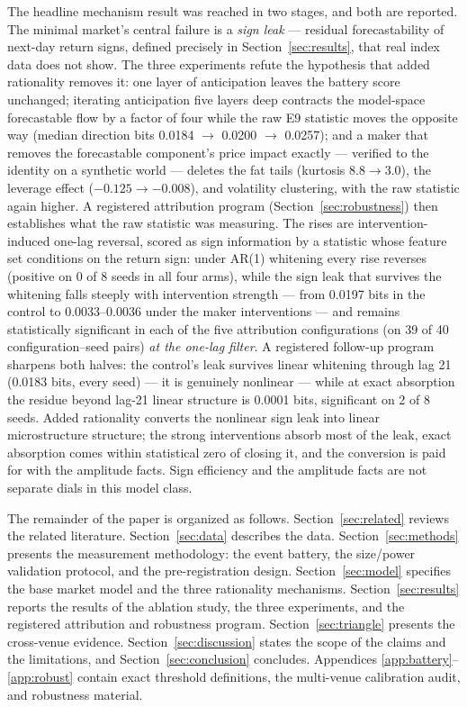 \documentclass[11pt]{article}
\begin{document}
The headline mechanism result was reached in two stages, and both are
reported. The minimal market's central failure is a \emph{sign leak} ---
residual forecastability of next-day return signs, defined precisely in
Section~\ref{sec:results}, that real index data does not show. The three
experiments refute the hypothesis that added rationality removes it:
one layer of anticipation leaves the battery score unchanged; iterating
anticipation five layers deep contracts the model-space forecastable flow
by a factor of four while the raw E9 statistic moves the opposite way
(median direction bits 0.0184 $\to$ 0.0200 $\to$ 0.0257); and a maker
that removes the forecastable component's price impact exactly ---
verified to the identity on a synthetic world --- deletes the fat tails
(kurtosis $8.8 \to 3.0$), the leverage effect ($-0.125 \to -0.008$), and
volatility clustering, with the raw statistic again higher.
A registered attribution program (Section~\ref{sec:robustness}) then
establishes what the raw statistic was measuring. The rises are
intervention-induced one-lag reversal, scored as sign information by a
statistic whose feature set conditions on the return sign: under AR(1)
whitening every rise reverses (positive on 0 of 8 seeds in all four
arms), while the sign leak that survives the whitening falls steeply with
intervention strength --- from 0.0197 bits in the control to
0.0033--0.0036 under the maker interventions --- and remains
statistically significant in
each of the five attribution configurations (on 39 of 40
configuration--seed pairs) \emph{at the one-lag filter}. A registered
follow-up program sharpens both halves: the control's leak survives
linear whitening through lag 21 (0.0183 bits, every seed) --- it is
genuinely nonlinear --- while at exact absorption the residue beyond
lag-21 linear structure is 0.0001 bits, significant on 2 of 8 seeds.
Added rationality converts the nonlinear sign leak into linear
microstructure structure; the strong interventions absorb most of
the leak, exact absorption comes within statistical zero of closing it,
and the conversion is paid for with the
amplitude facts.
Sign efficiency and the amplitude facts are not separate dials in this
model class.

The remainder of the paper is organized as follows.
Section~\ref{sec:related} reviews the related literature.
Section~\ref{sec:data} describes the data.
Section~\ref{sec:methods} presents the measurement methodology: the event
battery, the size/power validation protocol, and the pre-registration
design. Section~\ref{sec:model} specifies the base market model and the
three rationality mechanisms. Section~\ref{sec:results} reports the
results of the ablation study, the three experiments, and the registered
attribution and robustness program.
Section~\ref{sec:triangle} presents the cross-venue evidence.
Section~\ref{sec:discussion} states the scope of the claims and the
limitations, and Section~\ref{sec:conclusion} concludes. Appendices
\ref{app:battery}--\ref{app:robust} contain exact threshold definitions,
the multi-venue calibration audit, and robustness material.
\end{document}
